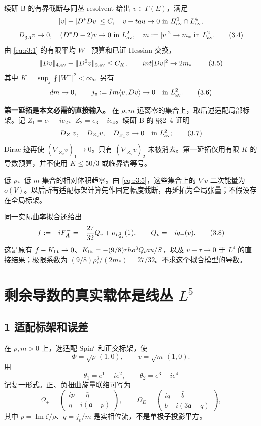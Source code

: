 \documentclass[UTF8,11pt,fontset=none]{ctexart}
\begin{document}
续研 B 的有界截断与同丛 resolvent 给出 \(v\in\Gamma(E)\)，满足 \[
 |v|+|\nabla^*\nabla v|\le C,
 \quad v-\tau\to0\text{ in }H^1_{\rm av}\cap L^4_{\rm av},
\] \[
 D^-_{3A}v\to0,\quad
 (\nabla^*\nabla-2)v\to0\text{ in }L^2_{\rm av},\quad
 m:=|v|^2\to m_*\text{ in }L^2_{\rm av}.
 \tag{3.4}\label{eq:r3:4}
\] 由 \eqref{eq:r3:1} 的有限平均 \(W^-\) 预算和已证 Hessian 交换， \[
 \|\nabla v\|_{4,\rm av}+\|\nabla^2v\|_{2,\rm av}\le C_K,
 \qquad \fint|\nabla v|^2\to2m_*.
 \tag{3.5}\label{eq:r3:5}
\] 其中 \(K=\sup_j\fint |W^-|^2<\infty\)。另有 \[
 dm\to0,\qquad j_v:=\operatorname{Im}\langle v,\nabla v\rangle\to0
 \quad\text{in }L^2_{\rm av}.
 \tag{3.6}\label{eq:r3:6}
\]

\textbf{第一延拓是本文必需的直接输入。} 在 \(\rho,m\) 远离零的集合上，取后述适配局部标架。记 \(Z_1=e_1-ie_2\)、\(Z_2=e_3-ie_4\)。续研 B 的  §§2--4 证明 \[
 \nabla_{Z_1}v,\quad \nabla_{Z_2}v,\quad
 \nabla_{\bar Z_1}v\to0\quad\text{in }L^2_{\rm av};
 \tag{3.7}\label{eq:r3:7}
\] Dirac 迹再使 \((\nabla_{\bar Z_2}v)_1\to0\)。只有 \((\nabla_{\bar Z_2}v)_2\) 未被消去。第一延拓仅用有限 \(K\) 的导数预算，并不使用 \(K\le50/3\) 或临界谱等号。

低 \(\rho\)、低 \(m\) 集合的相对体积趋零。由 \eqref{eq:r3:5}，这些集合上的 \(\nabla v\) 二次能量为 \(o(V)\)。以后所有适配标架计算先作固定幅度截断，再延拓为全局张量；不假设存在全局标架。

同一实际曲率拟合还给出 \[
 f:=-iF_A^-=-\frac{27}{32}Q_v+o_{L^2_{\rm av}}(1),
 \qquad Q_v=-iq_-(v).
 \tag{3.8}\label{eq:r3:8}
\] 这是原有 \(f-K_{\rm fit}\to0\)、\(K_{\rm fit}=-(9/8)\rho^3Q_\tau/S\)，以及 \(v-\tau\to0\) 于 \(L^4\) 的直接结果；极限系数为 \((9/8)\rho_*^3/(2m_*)=27/32\)。不求这个拟合模型的导数。

\section{\texorpdfstring{剩余导数的真实载体是线丛 \(L^5\)}{剩余导数的真实载体是线丛 L\^{}5}}\label{ch3:ux5269ux4f59ux5bfcux6570ux7684ux771fux5b9eux8f7dux4f53ux662fux7ebfux4e1b-l5}

\subsection{1 适配标架和误差}\label{ch3:ux9002ux914dux6807ux67b6ux548cux8befux5dee}

在 \(\rho,m>0\) 上，选适配 Spin\(^c\) 和正交标架，使 \[
 \Phi=\sqrt\rho\,(1,0),\qquad v=\sqrt m\,(1,0).
\] 用 \[
 \theta_1=e^1-ie^2,\qquad \theta_2=e^3-ie^4
\] 记复一形式。正、负扭曲旋量联络可写为 \[
 \Omega_+=\begin{pmatrix}ip&-\bar\eta\\\eta&i(\mathfrak a-p)\end{pmatrix},
 \qquad
 \Omega_E=\begin{pmatrix}iq&-\bar b\\b&i(3\mathfrak a-q)\end{pmatrix},
 \tag{3.9}\label{eq:r3:9}
\] 其中 \(p=\operatorname{Im}\zeta/\rho\)、\(q=j_v/m\) 是实相位流，不是单极子投影平方。
\end{document}
